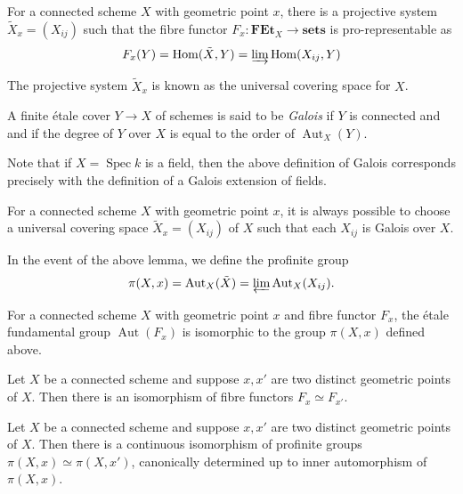 \documentclass[11pt,openany]{book} %
\newcommand{\spc}{\operatorname{Spec}}
\newcommand{\Aut}{\operatorname{Aut}}
\begin{document}
\begin{lemma}
For a connected scheme $X$ with geometric point $x$, there is a projective system $\tilde{X}_x = (X_{ij})$ such that the fibre functor $F_x : \mathbf{FEt}_X \to \mathbf{sets}$ is pro-representable as
\[
F_x(Y) = \operatorname{Hom}(\tilde{X},Y) = \varinjlim \operatorname{Hom}(X_{ij},Y)
\]
\end{lemma}
\medskip

The projective system $\tilde{X}_x$ is known as the universal covering space for $X$.\\

\begin{definition}
A finite \'etale cover $Y \to X$ of schemes is said to be \emph{Galois} if $Y$ is connected and and if the degree of $Y$ over $X$ is equal to the order of $\Aut_X(Y)$.
\end{definition}

Note that if $X = \spc k$ is a field, then the above definition of Galois corresponds precisely with the definition of a Galois extension of fields.\\

\begin{lemma}
For a connected scheme $X$ with geometric point $x$, it is always possible to choose a universal covering space $\tilde{X}_x = (X_{ij})$ of $X$ such that each $X_{ij}$ is Galois over $X$.
\end{lemma}
\medskip

In the event of the above lemma, we define the profinite group
\[
\pi(X,x) = \Aut_X(\tilde{X}) = \varprojlim \Aut_X(X_{ij}).
\]

\begin{proposition}
For a connected scheme $X$ with geometric point $x$ and fibre functor $F_x$, the \'etale fundamental group $\Aut(F_x)$ is isomorphic to the group $\pi(X,x)$ defined above.
\end{proposition}

\begin{proposition}
Let $X$ be a connected scheme and suppose $x,x'$ are two distinct geometric points of $X$. Then there is an isomorphism of fibre functors $F_x \simeq F_{x'}$.
\end{proposition}

\begin{corollary}
Let $X$ be a connected scheme and suppose $x,x'$ are two distinct geometric points of $X$. Then there is a continuous isomorphism of profinite groups $\pi(X,x) \simeq \pi(X,x')$, canonically determined up to inner automorphism of $\pi(X,x)$.
\end{corollary}
\end{document}
